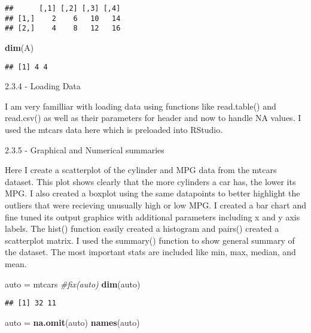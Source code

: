 \documentclass[]{article}
\newenvironment{Shaded}{\begin{snugshade}}{\end{snugshade}}
\newcommand{\KeywordTok}[1]{\textcolor[rgb]{0.13,0.29,0.53}{\textbf{#1}}}
\newcommand{\StringTok}[1]{\textcolor[rgb]{0.31,0.60,0.02}{#1}}
\newcommand{\CommentTok}[1]{\textcolor[rgb]{0.56,0.35,0.01}{\textit{#1}}}
\newcommand{\NormalTok}[1]{#1}
\begin{document}
\begin{verbatim}
##      [,1] [,2] [,3] [,4]
## [1,]    2    6   10   14
## [2,]    4    8   12   16
\end{verbatim}

\begin{Shaded}
\begin{Highlighting}[]
\KeywordTok{dim}\NormalTok{(A)}
\end{Highlighting}
\end{Shaded}

\begin{verbatim}
## [1] 4 4
\end{verbatim}

2.3.4 - Loading Data

I am very familliar with loading data using functions like read.table()
and read.csv() as well as their parameters for header and now to handle
NA values. I used the mtcars data here which is preloaded into RStudio.

2.3.5 - Graphical and Numerical summaries

Here I create a scatterplot of the cylinder and MPG data from the mtcars
dataset. This plot shows clearly that the more cylinders a car has, the
lower its MPG. I also created a boxplot using the same datapoints to
better highlight the outliers that were recieving unusually high or low
MPG. I created a bar chart and fine tuned its output graphics with
additional parameters including x and y axis labels. The hist() function
easily created a histogram and pairs() created a scatterplot matrix. I
used the summary() function to show general summary of the dataset. The
most important stats are included like min, max, median, and mean.

\begin{Shaded}
\begin{Highlighting}[]
\NormalTok{auto =}\StringTok{ }\NormalTok{mtcars}
\CommentTok{#fix(auto)}
\KeywordTok{dim}\NormalTok{(auto)}
\end{Highlighting}
\end{Shaded}

\begin{verbatim}
## [1] 32 11
\end{verbatim}

\begin{Shaded}
\begin{Highlighting}[]
\NormalTok{auto =}\StringTok{ }\KeywordTok{na.omit}\NormalTok{(auto)}
\KeywordTok{names}\NormalTok{(auto)}
\end{Highlighting}
\end{Shaded}
\end{document}
